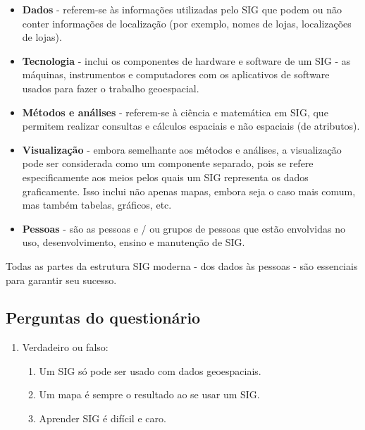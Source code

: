 \documentclass[
  portuguese,
]{krantz}
\providecommand{\tightlist}{%
  \setlength{\itemsep}{0pt}\setlength{\parskip}{0pt}}
\begin{document}
\begin{itemize}
\tightlist
\item
  \textbf{Dados} - referem-se às informações utilizadas pelo SIG que podem ou não conter informações de localização (por exemplo, nomes de lojas, localizações de lojas).
\item
  \textbf{Tecnologia} - inclui os componentes de hardware e software de um SIG - as máquinas, instrumentos e computadores com os aplicativos de software usados para fazer o trabalho geoespacial.
\item
  \textbf{Métodos e análises} - referem-se à ciência e matemática em SIG, que permitem realizar consultas e cálculos espaciais e não espaciais (de atributos).
\item
  \textbf{Visualização} - embora semelhante aos métodos e análises, a visualização pode ser considerada como um componente separado, pois se refere especificamente aos meios pelos quais um SIG representa os dados graficamente. Isso inclui não apenas mapas, embora seja o caso mais comum, mas também tabelas, gráficos, etc.
\item
  \textbf{Pessoas} - são as pessoas e / ou grupos de pessoas que estão envolvidas no uso, desenvolvimento, ensino e manutenção de SIG.
\end{itemize}

Todas as partes da estrutura SIG moderna - dos dados às pessoas - são essenciais para garantir seu sucesso.

\hypertarget{perguntas-do-questionuxe1rio}{%
\subsection{Perguntas do questionário}\label{perguntas-do-questionuxe1rio}}

\begin{enumerate}
\def\labelenumi{\arabic{enumi}.}
\tightlist
\item
  Verdadeiro ou falso:

  \begin{enumerate}
  \def\labelenumii{\arabic{enumii}.}
  \tightlist
  \item
    Um SIG só pode ser usado com dados geoespaciais.
  \item
    Um mapa é sempre o resultado ao se usar um SIG.
  \item
    Aprender SIG é difícil e caro.
  \end{enumerate}
\end{enumerate}
\end{document}
